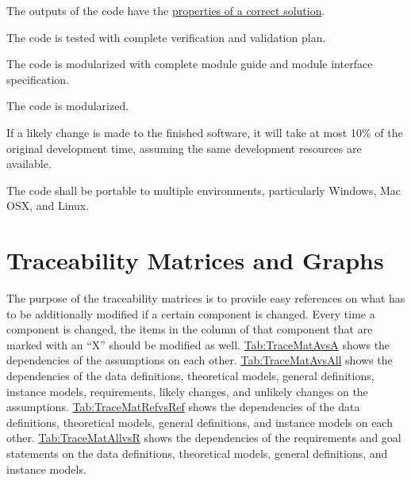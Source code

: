 \documentclass[12pt]{article}
\begin{document}
\begin{description}[font=\normalfont]
\item[Correctness:\phantomsection\label{correct}]{The outputs of the code have the \hyperref[Sec:CorSolProps]{properties of a correct solution}.}
\item[Verifiability:\phantomsection\label{verifiable}]{The code is tested with complete verification and validation plan.}
\item[Understandability:\phantomsection\label{understandable}]{The code is modularized with complete module guide and module interface specification.}
\item[Reusability:\phantomsection\label{reusable}]{The code is modularized.}
\item[Maintainability:\phantomsection\label{maintainable}]{If a likely change is made to the finished software, it will take at most 10$\%$ of the original development time, assuming the same development resources are available.}
\item[Portability:\phantomsection\label{portable}]{The code shall be portable to multiple environments, particularly Windows, Mac OSX, and Linux.}
\end{description}
\section{Traceability Matrices and Graphs}
\label{Sec:TraceMatrices}
The purpose of the traceability matrices is to provide easy references on what has to be additionally modified if a certain component is changed. Every time a component is changed, the items in the column of that component that are marked with an ``X'' should be modified as well. \hyperref[Table:TraceMatAvsA]{Tab:TraceMatAvsA} shows the dependencies of the assumptions on each other. \hyperref[Table:TraceMatAvsAll]{Tab:TraceMatAvsAll} shows the dependencies of the data definitions, theoretical models, general definitions, instance models, requirements, likely changes, and unlikely changes on the assumptions. \hyperref[Table:TraceMatRefvsRef]{Tab:TraceMatRefvsRef} shows the dependencies of the data definitions, theoretical models, general definitions, and instance models on each other. \hyperref[Table:TraceMatAllvsR]{Tab:TraceMatAllvsR} shows the dependencies of the requirements and goal statements on the data definitions, theoretical models, general definitions, and instance models.
\end{document}
